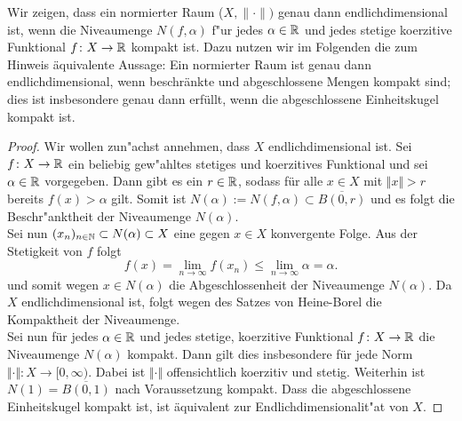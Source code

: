 
Wir zeigen, dass ein normierter Raum ($X, \lVert\cdot\rVert)$ genau dann endlichdimensional ist, wenn die Niveaumenge
$N(f,\alpha)$ f"ur jedes $\alpha\in\mathbb{R}$ und
jedes stetige koerzitive Funktional
$f\colon X\to\mathbb{R}$ kompakt ist. Dazu
nutzen wir im Folgenden die zum Hinweis äquivalente Aussage: Ein normierter Raum ist genau dann endlichdimensional, wenn beschränkte und abgeschlossene Mengen kompakt sind;
dies ist insbesondere genau dann erfüllt, wenn die abgeschlossene Einheitskugel kompakt ist.

\begin{proof}
Wir wollen zun"achst annehmen, dass $X$ endlichdimensional ist. Sei $f\colon X\to\mathbb{R}$
ein beliebig gew"ahltes stetiges und koerzitives Funktional und sei $\alpha\in\mathbb{R}$
vorgegeben.
 Dann gibt es ein
 $r\in\mathbb{R}$, sodass für alle $x\in X$ mit $\Vert x\Vert>r$ bereits $f(x)>\alpha$ gilt. Somit ist $N(\alpha):=N(f,\alpha) \subset \overline{B(0,r)}$ und es folgt die
 Beschr"anktheit der Niveaumenge $N(\alpha)$.\\

 Sei nun $(x_n)_{n\in\mathbb{N}}\subset N(\alpha)\subset X$ eine gegen $x\in X$ konvergente Folge. Aus der Stetigkeit von $f$ folgt
 \begin{displaymath}
  f(x)=\lim_{n\to\infty} f(x_n)  \le \lim_{n\to\infty} \alpha =\alpha.
 \end{displaymath}
und somit wegen $x\in N(\alpha)$ die Abgeschlossenheit der Niveaumenge $N(\alpha)$. Da $X$ endlichdimensional ist,
folgt wegen des Satzes von Heine-Borel die
Kompaktheit der Niveaumenge.\\

Sei nun für jedes $\alpha\in \mathbb{R}$ und jedes stetige, koerzitive Funktional $f\colon X\to\mathbb{R}$ die Niveaumenge $N(\alpha)$ kompakt. Dann gilt
dies insbesondere für jede Norm $\Vert\cdot\Vert: X\to [0,\infty)$.
Dabei ist $\Vert\cdot\Vert$ offensichtlich koerzitiv und stetig. Weiterhin ist $N(1)=\overline{B(0,1)}$ nach Voraussetzung kompakt.
Dass die abgeschlossene Einheitskugel kompakt ist, ist äquivalent zur Endlichdimensionalit"at von $X$.
\end{proof}
